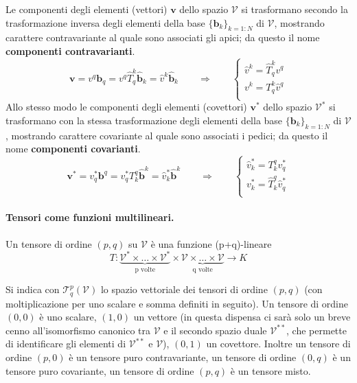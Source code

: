  \noindent
 Le componenti degli elementi (vettori) $\bm{v}$ dello spazio $\mathcal{V}$ si trasformano secondo la trasformazione inversa degli elementi della base
 $\{ \bm{b}_k \}_{k=1:N}$ di $\mathcal{V}$, mostrando carattere contravariante al quale sono associati gli apici;
 da questo il nome \textbf{componenti contravarianti}.
 \begin{equation}
  \bm{v} = v^q \bm{b}_q = v^q \hat{T}^k_q \bm{\hat{b}}_k = \hat{v}^k \bm{\hat{b}}_k 
  \qquad  \Rightarrow \qquad
  \begin{cases}
     \hat{v}^k = \hat{T}^k_q v^q \\
     v^k       = T^k_q \hat{v}^q \\
  \end{cases}
 \end{equation}
 Allo stesso modo le componenti degli elementi (covettori) $\bm{v^*}$ dello spazio $\mathcal{V^*}$ si trasformano con la stessa trasformazione degli elementi
  della base
 $\{ \bm{b}_k \}_{k=1:N}$ di $\mathcal{V}$, mostrando carattere covariante al quale sono associati i pedici;
  da questo il nome \textbf{componenti covarianti}.
 \begin{equation}
  \bm{v^*} = v^*_q \bm{b}^q = v^*_q T^q_k \bm{\hat{b}}^k = \hat{v}^*_k \bm{\hat{b}}^k 
  \qquad  \Rightarrow \qquad
  \begin{cases}
     \hat{v}^*_k = T^q_k v^*_q \\
     v^*_k       = \hat{T}^q_k \hat{v}^*_q \\
  \end{cases}
 \end{equation}
 



 \paragraph{Tensori come funzioni multilineari.} Un tensore di ordine $(p,q)$ su $\mathcal{V}$ è una funzione
 (p+q)-lineare
\begin{equation}
   T : \underbrace{\mathcal{V}^* \times \dots \times \mathcal{V}^*}_{\text{p volte}} \times
       \underbrace{\mathcal{V}   \times \dots \times \mathcal{V}  }_{\text{q volte}} \rightarrow K
\end{equation}
 
 Si indica con $\mathcal{T}^p_q(\mathcal{V})$ lo spazio vettoriale dei tensori di ordine $(p,q)$ 
 (con moltiplicazione per uno scalare e somma definiti in seguito). %
 Un tensore di ordine $(0,0)$ è uno scalare, $(1,0)$ un vettore (in questa dispensa ci sarà
 solo un breve cenno all'isomorfismo canonico tra 
 $\mathcal{V}$ e il secondo spazio duale $\mathcal{V}^{**}$, che permette di identificare gli elementi di
 $\mathcal{V}^{**}$ e $\mathcal{V}$), $(0,1)$ un covettore. Inoltre un tensore di ordine
 $(p,0)$ è un tensore puro contravariante, un tensore di ordine $(0,q)$ è un tensore puro
 covariante, un tensore di ordine $(p,q)$ è un tensore misto.
 
